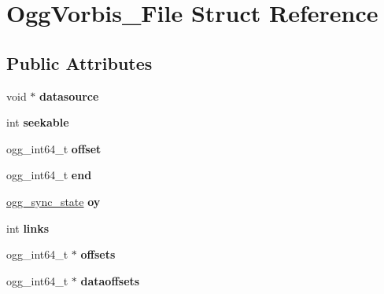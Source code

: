 \hypertarget{struct_ogg_vorbis___file}{
\section{OggVorbis\_\-File Struct Reference}
\label{struct_ogg_vorbis___file}
}
\subsection*{Public Attributes}
\begin{DoxyCompactItemize}
\item 
\hypertarget{struct_ogg_vorbis___file_a46afb3dcc7aac5917573e41d7504c0d6}{
void $\ast$ {\bfseries datasource}}
\label{struct_ogg_vorbis___file_a46afb3dcc7aac5917573e41d7504c0d6}

\item 
\hypertarget{struct_ogg_vorbis___file_a2a390c4f15c0d1fe0cf9c90fd0bae087}{
int {\bfseries seekable}}
\label{struct_ogg_vorbis___file_a2a390c4f15c0d1fe0cf9c90fd0bae087}

\item 
\hypertarget{struct_ogg_vorbis___file_a36f8f9f012cd2e7ab8cb395b787376cb}{
ogg\_\-int64\_\-t {\bfseries offset}}
\label{struct_ogg_vorbis___file_a36f8f9f012cd2e7ab8cb395b787376cb}

\item 
\hypertarget{struct_ogg_vorbis___file_ae56eb8bc78d2fc27c79d145a7c80a681}{
ogg\_\-int64\_\-t {\bfseries end}}
\label{struct_ogg_vorbis___file_ae56eb8bc78d2fc27c79d145a7c80a681}

\item 
\hypertarget{struct_ogg_vorbis___file_ae35fa1e6f99edcb104566301324ecf94}{
\hyperlink{structogg__sync__state}{ogg\_\-sync\_\-state} {\bfseries oy}}
\label{struct_ogg_vorbis___file_ae35fa1e6f99edcb104566301324ecf94}

\item 
\hypertarget{struct_ogg_vorbis___file_ad41f80ffaa6b48a14addef0a02639a87}{
int {\bfseries links}}
\label{struct_ogg_vorbis___file_ad41f80ffaa6b48a14addef0a02639a87}

\item 
\hypertarget{struct_ogg_vorbis___file_af9fe0ece4ff98e207682731b36951920}{
ogg\_\-int64\_\-t $\ast$ {\bfseries offsets}}
\label{struct_ogg_vorbis___file_af9fe0ece4ff98e207682731b36951920}

\item 
\hypertarget{struct_ogg_vorbis___file_af797824fb6e98c0248c19e6909dd680e}{
ogg\_\-int64\_\-t $\ast$ {\bfseries dataoffsets}}
\label{struct_ogg_vorbis___file_af797824fb6e98c0248c19e6909dd680e}


\end{DoxyCompactItemize}
